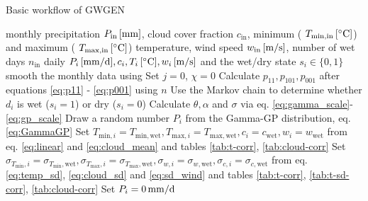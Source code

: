 \documentclass[
11pt, %
english, %
singlespacing, %
headsepline, %
]{MastersDoctoralThesis} %
\makeatletter
\DeclareRobustCommand*\unit[1]%
{\ensuremath{%
		{\thinmuskip3mu\relax
			\def\mu{\text{\textmu}}\def~{\,}%
			\ifx\f@series\testbx\mathbf{#1}\else\mathrm{#1}\fi}}}
\makeatother
\begin{document}
\begin{NoHyper}
\begin{refsection}
\begin{algorithm}
	\renewcommand{\algorithmicensure}{\textbf{Output:}}
	\caption{Basic workflow of GWGEN}
	\label{a:gwgen}
	\begin{algorithmic}[1]
		\REQUIRE monthly precipitation $P_\mathrm{in}\, [\unit{mm}]$, cloud cover fraction $c_\mathrm{in}$, minimum ( $T_{\mathrm{min}, \mathrm{in}}\, [^\circ\unit{C}]$) and maximum ( $T_{\mathrm{max}, \mathrm{in}}\, [^\circ\unit{C}]$) temperature, wind speed $w_\mathrm{in}\, [\unit{m/s}]$, number of wet days $n_\mathrm{in}$
		\ENSURE daily $P_i\, [\unit{mm/d}], c_i, T_i\, [^\circ\unit{C}], w_i \, [\unit{m/s}]$ and the wet/dry state $s_i\in\{0, 1\}$
		\STATE smooth the monthly data using \cite{RymesMyers2001}
		\STATE Set $j=0$, $\chi = 0$
		 \label{a:gwgen:accuracy-criteria}
		\STATE Calculate $p_{11}, p_{101}, p_{001}$ after equations \eqref{eq:p11} - \eqref{eq:p001} using $n$ 				 \label{a:gwgen:markov}
		\STATE Use the Markov chain to determine whether $d_i$ is wet ($s_i = 1$) or dry ($s_i = 0$)
		\STATE Calculate $\theta, \alpha$ and $\sigma$ via eq. \eqref{eq:gamma_scale}-\eqref{eq:gp_scale} 
		\STATE Draw a random number $P_i$ from the Gamma-GP distribution, eq. \eqref{eq:GammaGP}
		\STATE Set $T_{\mathrm{min}, i} = T_{\mathrm{min}, \mathrm{wet}}, T_{\mathrm{max}, i} = T_{\mathrm{max}, \mathrm{wet}}, c_i = c_\mathrm{wet}, w_i = w_\mathrm{wet}$ from eq. \eqref{eq:linear} and \eqref{eq:cloud_mean} and tables \ref{tab:t-corr}, \ref{tab:cloud-corr} \label{a:gwgen:adjust_wet}
		\STATE Set $
		\sigma_{T_\mathrm{min},i} = \sigma_{T_\mathrm{min},\mathrm{wet}}, \sigma_{T_\mathrm{max},i} = \sigma_{T_\mathrm{max},\mathrm{wet}}, \sigma_{w,i} = \sigma_{w,\mathrm{wet}}, \sigma_{c,i} = \sigma_{c,\mathrm{wet}}$ from eq. \eqref{eq:temp_sd}, \eqref{eq:cloud_sd} and \eqref{eq:sd_wind} and tables \ref{tab:t-corr}, \ref{tab:t-sd-corr}, \ref{tab:cloud-corr}
		\ELSE
		\STATE Set $P_i = 0\,\unit{mm/d}$

\end{algorithmic}
\end{algorithm}
\end{refsection}
\end{NoHyper}
\end{document}
